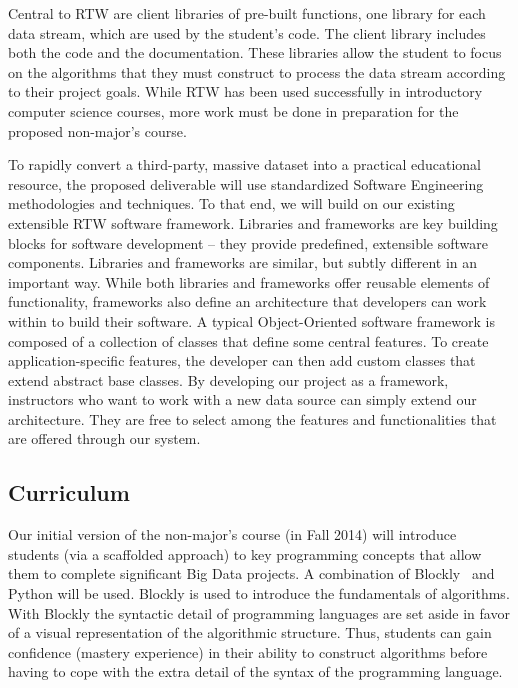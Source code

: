 \documentclass[11pt]{article}
\begin{document}
Central to RTW are client libraries of pre-built functions, one
library for each data stream, which are used by the student's
code. The client library includes both the code and the documentation.
These libraries allow the student to focus on the algorithms that they
must construct to process the data stream according to their
project goals. While RTW has been used successfully in introductory
computer science courses, more work must be done in preparation for
the proposed non-major's course.

To rapidly convert a third-party, massive dataset into a practical
educational resource, the proposed deliverable will use standardized
Software Engineering methodologies and techniques. To that end, we
will build on our existing extensible RTW software framework.
Libraries and frameworks are key building blocks for software
development -- they provide predefined, extensible software
components.  Libraries and frameworks are similar, but subtly
different in an important way.  While both libraries and frameworks
offer reusable elements of functionality, frameworks also define an
architecture that developers can work within to build their
software. A typical Object-Oriented software framework is composed of
a collection of classes that define some central features. To create
application-specific features, the developer can then add custom
classes that extend abstract base classes. By developing our project
as a framework, instructors who want to work with a new data source
can simply extend our architecture.
They are free to select among the features and functionalities that
are offered through our system.

\subsection{Curriculum}

Our initial version of the non-major's course (in Fall 2014) will
introduce students (via a scaffolded approach) to key programming
concepts that allow them to complete significant Big Data projects. A
combination of Blockly~\cite{blockly} and Python will be used.
Blockly is used to introduce the fundamentals of algorithms. With Blockly the syntactic detail of programming languages are set aside in favor of a visual representation of the algorithmic structure. Thus, students can gain confidence (mastery experience) in their ability to construct algorithms before having to cope with the extra detail of the syntax of the programming language.
\end{document}
